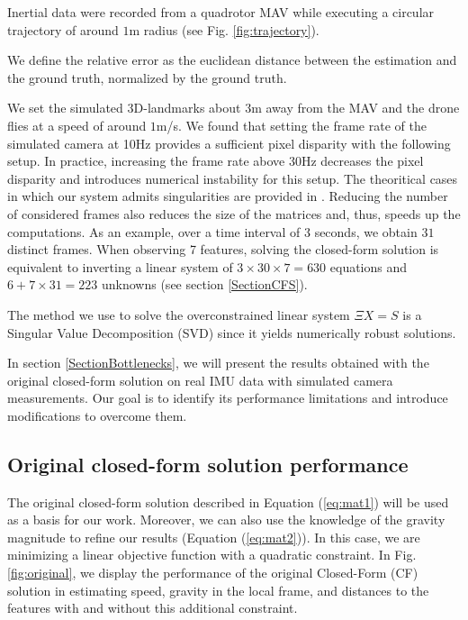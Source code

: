\documentclass[letterpaper, 10 pt, journal, final]{ieeeconf}  %
\begin{document}
Inertial data were recorded from a quadrotor MAV while executing a circular trajectory of around $1$m radius (see Fig. \ref{fig:trajectory}).

We define the relative error as the euclidean distance between the estimation and the ground truth,
normalized by the ground truth.

We set the simulated 3D-landmarks about $3$m away from the MAV and the drone flies at a speed of around $1$m/s.
We found that setting the frame rate of the simulated camera at 10Hz provides a sufficient pixel disparity with the following setup.
In practice, increasing the frame rate above 30Hz decreases the pixel disparity and introduces numerical instability for this setup.
The theoritical cases in which our system admits singularities are provided in \cite{Martinelli2012}\cite{Martinelli2014}.
Reducing the number of considered frames also reduces the size of the matrices and, thus, speeds up the computations.
As an example, over a time interval of 3 seconds, we obtain $31$ distinct frames.
When observing 7 features, solving the closed-form solution is equivalent to inverting a linear system of $3\times 30\times 7 = 630$ equations and $6+7\times 31=223$ unknowns (see section \ref{SectionCFS}).

The method we use to solve the overconstrained linear system $\Xi X = S$ is a Singular Value Decomposition (SVD) since it yields numerically robust solutions.

In section \ref{SectionBottlenecks}, we will present the results obtained with the original closed-form solution on real IMU data with simulated camera measurements.
Our goal is to identify its performance limitations and introduce modifications to overcome them.



\subsection{Original closed-form solution performance}

The original closed-form solution described in Equation (\ref{eq:mat1}) will be used as a basis for our work.
Moreover, we can also use the knowledge of the gravity magnitude to refine our results (Equation (\ref{eq:mat2})).
In this case, we are minimizing a linear objective function with a quadratic constraint.
In Fig. \ref{fig:original}, we display the performance of the original Closed-Form (CF) solution in estimating speed, gravity in the local frame, and distances to the features with and without this additional constraint.
\end{document}
